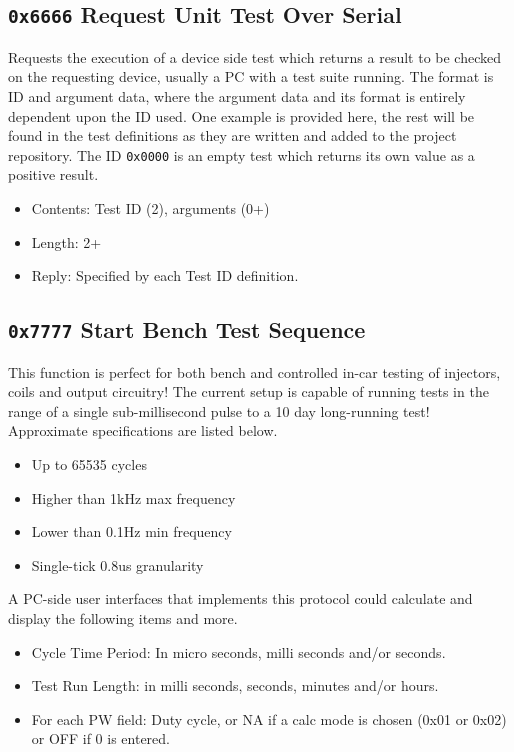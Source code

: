 \documentclass[12pt,a4paper,titlepage]{article}
\begin{document}
\begin{titlepage}
\begin{center}
\subsection{\texttt{0x6666} Request Unit Test Over Serial}

Requests the execution of a device side test which returns a result to be checked on the requesting device, usually a PC with a test suite running. The format is ID and argument data, where the argument data and its format is entirely dependent upon the ID used. One example is provided here, the rest will be found in the test definitions as they are written and added to the project repository. The ID \texttt{0x0000} is an empty test which returns its own value as a positive result.

\begin{itemize}
\item Contents: Test ID (2), arguments (0+)
\item Length: 2+
\item Reply: Specified by each Test ID definition.
\end{itemize}


\subsection{\texttt{0x7777} Start Bench Test Sequence}

This function is perfect for both bench and controlled in-car testing of injectors, coils and output circuitry! The current setup is capable of running tests in the range of a single sub-millisecond pulse to a 10 day long-running test! Approximate specifications are listed below.

\begin{itemize}
\item Up to 65535 cycles
\item Higher than 1kHz max frequency
\item Lower than 0.1Hz min frequency
\item Single-tick 0.8us granularity
\end{itemize}

A PC-side user interfaces that implements this protocol could calculate and display the following items and more.

\begin{itemize}
\item Cycle Time Period: In micro seconds, milli seconds and/or seconds.
\item Test Run Length: in milli seconds, seconds, minutes and/or hours.
\item For each PW field: Duty cycle, or NA if a calc mode is chosen (0x01 or 0x02) or OFF if 0 is entered.
\end{itemize}


\end{center}
\end{titlepage}
\end{document}

